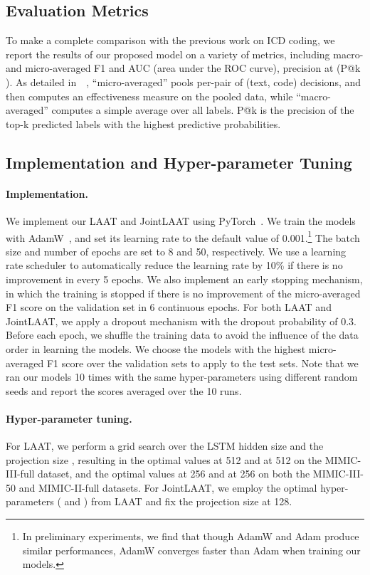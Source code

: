 \documentclass{article}
\begin{document}
\subsection{Evaluation Metrics}
To make a complete comparison with the previous work on ICD coding, we report the results of our proposed model on a variety of metrics, including macro- and micro-averaged F1 and AUC (area under the ROC curve), precision at  (P@k ). As detailed in~\citeauthor{schutze2008introduction}~, ``micro-averaged'' pools per-pair of (text, code) decisions, and then computes an effectiveness measure on the pooled data, while ``macro-averaged'' computes a simple average over all labels. P@k is the precision of the top-k predicted labels with the highest predictive probabilities.

\subsection{Implementation and Hyper-parameter Tuning}

\paragraph{Implementation.} We implement our  LAAT and JointLAAT using PyTorch~\cite{paszke2019}. We train the models with AdamW~\cite{loshchilov2017fixing}, and  set its learning rate to the default value of 0.001.\footnote{In preliminary experiments, we find that though AdamW  and Adam \cite{kingma2014adam} produce  similar performances, AdamW converges faster than Adam when training our models.} The batch size and number of epochs are set to 8 and 50, respectively. We use a learning rate scheduler to automatically reduce the learning rate by 10\% if there is no improvement in every 5 epochs. We also implement an early stopping mechanism, in which the training is stopped if there is no improvement of the micro-averaged F1 score on the validation set in 6 continuous epochs. For both LAAT and JointLAAT, we apply a dropout mechanism with the dropout probability of 0.3. Before each epoch, we shuffle the training data to avoid the influence of the data order in learning the models. 
We choose the models with the highest micro-averaged F1 score over the validation sets to apply to the test sets. Note that we ran our models 10 times with the same hyper-parameters using different random seeds and report the scores averaged over the 10 runs.

\paragraph{Hyper-parameter tuning.} For LAAT,  we perform a grid search over the LSTM hidden size  and the projection size , resulting in the optimal values  at 512 and  at 512 on the MIMIC-III-full dataset, and the optimal values  at 256 and  at 256 on both the MIMIC-III-50 and MIMIC-II-full datasets. For JointLAAT, we employ the optimal hyper-parameters ( and ) from LAAT and fix the projection size  at 128.
\end{document}
